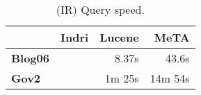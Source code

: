 \begin{table}[t]
\centering
{\small
\begin{tabular}{|l|r|r|r|}
    \hline & \textbf{Indri} & \textbf{Lucene} & \textbf{MeTA} \\
    \hline
    \textbf{Blog06} & & 8.37s & 43.6s \\
    \textbf{Gov2} & & 1m 25s & 14m 54s \\
    \hline
\end{tabular}
\caption{(IR) Query speed.}
\label{table:ir-query-speed}
}
\end{table}
